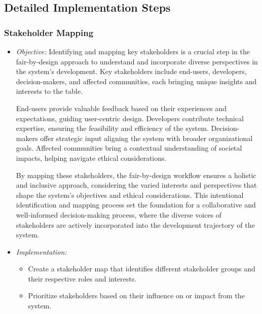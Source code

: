 \subsection{Detailed Implementation Steps}

\subsubsection{Stakeholder Mapping}

\begin{itemize}
    
    \item \emph{Objective:} Identifying and mapping key stakeholders is a crucial step in the fair-by-design approach to understand and incorporate diverse perspectives in the system's development. Key stakeholders include end-users, developers, decision-makers, and affected communities, each bringing unique insights and interests to the table.

    End-users provide valuable feedback based on their experiences and expectations, guiding user-centric design. Developers contribute technical expertise, ensuring the feasibility and efficiency of the system. Decision-makers offer strategic input aligning the system with broader organizational goals. Affected communities bring a contextual understanding of societal impacts, helping navigate ethical considerations.
    
    By mapping these stakeholders, the fair-by-design workflow ensures a holistic and inclusive approach, considering the varied interests and perspectives that shape the system's objectives and ethical considerations. This intentional identification and mapping process set the foundation for a collaborative and well-informed decision-making process, where the diverse voices of stakeholders are actively incorporated into the development trajectory of the system.

    \item \emph{Implementation:}
    
    \begin{itemize}
    
        \item Create a stakeholder map that identifies different stakeholder groups and their respective roles and interests.
    
        \item Prioritize stakeholders based on their influence on or impact from the system.
    
    \end{itemize}

\end{itemize}


